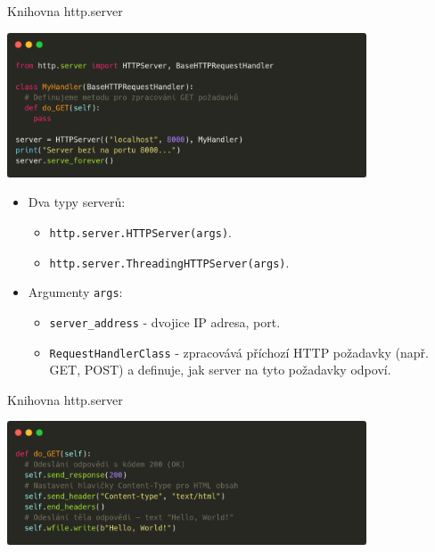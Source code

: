 \documentclass{beamer}
\begin{document}
\begin{frame}{Knihovna http.server}
    \begin{center}
        \includegraphics[width=0.8\textwidth]{obrazky/codes/carbon13.png}
    \end{center}

	\begin{itemize}
		\item Dva typy serverů:
		\begin{itemize}
			\item \texttt{http.server.HTTPServer(args)}.
			\item \texttt{http.server.ThreadingHTTPServer(args)}.
		\end{itemize}
		\item Argumenty \texttt{args}:
		\begin{itemize}
			\item \texttt{server\_address} - dvojice IP adresa, port.
			\item \texttt{RequestHandlerClass} - zpracovává příchozí HTTP požadavky (např. GET, POST) a definuje, jak server na tyto požadavky odpoví.
		\end{itemize}
	\end{itemize}	
\end{frame}

\begin{frame}{Knihovna http.server}
    \begin{center}
        \includegraphics[width=0.8\textwidth]{obrazky/codes/carbon14.png}
    \end{center}
\end{frame}
\end{document}
